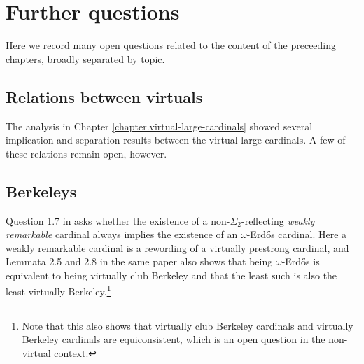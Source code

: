 \documentclass[../../main]{subfiles}
\begin{document}
\chapter{Further questions}
\thispagestyle{fancy}

Here we record many open questions related to the content of the preceeding chapters, broadly separated by topic.


\section{Relations between virtuals}

The analysis in Chapter \ref{chapter.virtual-large-cardinals} showed several implication and separation results between the virtual large cardinals. A few of these relations remain open, however.




\section{Berkeleys}

Question 1.7 in \cite{RemarkableWilson} asks whether the existence of a non-$\Sigma_2$-reflecting \textit{weakly remarkable} cardinal always implies the existence of an $\omega$-Erd\H os cardinal. Here a weakly remarkable cardinal is a rewording of a virtually prestrong cardinal, and Lemmata 2.5 and 2.8 in the same paper also shows that being $\omega$-Erd\H os is equivalent to being virtually club Berkeley and that the least such is also the least virtually Berkeley.\footnote{Note that this also shows that virtually club Berkeley cardinals and virtually Berkeley cardinals are equiconsistent, which is an open question in the non-virtual context.}
\end{document}
